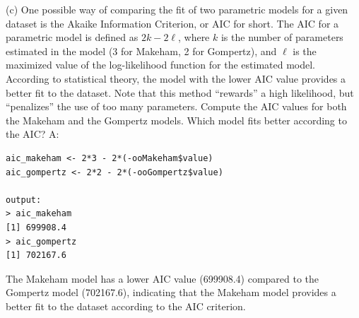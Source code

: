 \documentclass{article}
\begin{document}
\begin{enumerate}
\newpage
(c) One possible way of comparing the fit of two parametric models for a given dataset is the Akaike Information Criterion, or AIC for short. The AIC for a parametric model is defined as $2k - 2\ell$, where $k$ is the number of parameters estimated in the model (3 for Makeham, 2 for Gompertz), and $\ell$ is the maximized value of the log-likelihood function for the estimated model. According to statistical theory, the model with the lower AIC value provides a better fit to the dataset. Note that this method ``rewards'' a high likelihood, but ``penalizes'' the use of too many parameters.
Compute the AIC values for both the Makeham and the Gompertz models. Which model fits better according to the AIC?
\newline \newline A:
\begin{verbatim}
aic_makeham <- 2*3 - 2*(-ooMakeham$value)
aic_gompertz <- 2*2 - 2*(-ooGompertz$value)

output:
> aic_makeham
[1] 699908.4
> aic_gompertz
[1] 702167.6
\end{verbatim}
The Makeham model has a lower AIC value (699908.4) compared to the Gompertz model (702167.6), indicating that the Makeham model provides a better fit to the dataset according to the AIC criterion.

\end{enumerate}
\end{document}
